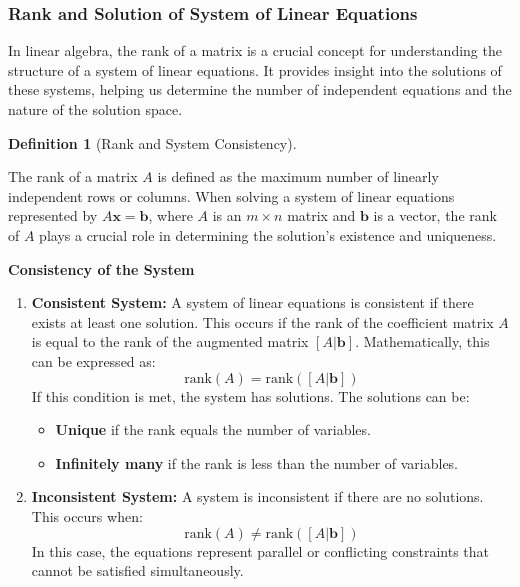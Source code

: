 \documentclass[
  letterpaper,
  DIV=11,
  numbers=noendperiod]{scrreprt}
\providecommand{\tightlist}{%
  \setlength{\itemsep}{0pt}\setlength{\parskip}{0pt}}\usepackage{longtable,booktabs,array}
\theoremstyle{plain}
\theoremstyle{definition}
\newtheorem{definition}{Definition}[chapter]
\theoremstyle{remark}
\begin{document}
\subsubsection*{Rank and Solution of System of Linear
Equations}\label{rank-and-solution-of-system-of-linear-equations}

In linear algebra, the rank of a matrix is a crucial concept for
understanding the structure of a system of linear equations. It provides
insight into the solutions of these systems, helping us determine the
number of independent equations and the nature of the solution space.

\begin{definition}[Rank and System
Consistency]\protect\hypertarget{def-soln}{}\label{def-soln}

The rank of a matrix \(A\) is defined as the maximum number of linearly
independent rows or columns. When solving a system of linear equations
represented by \(A\mathbf{x} = \mathbf{b}\), where \(A\) is an
\(m \times n\) matrix and \(\mathbf{b}\) is a vector, the rank of \(A\)
plays a crucial role in determining the solution's existence and
uniqueness.

\textbf{Consistency of the System}

\begin{enumerate}
\def\labelenumi{\arabic{enumi}.}
\tightlist
\item
  \textbf{Consistent System:} A system of linear equations is consistent
  if there exists at least one solution. This occurs if the rank of the
  coefficient matrix \(A\) is equal to the rank of the augmented matrix
  \([A|\mathbf{b}]\). Mathematically, this can be expressed as:
  \[\text{rank}(A) = \text{rank}([A|\mathbf{b}])\] If this condition is
  met, the system has solutions. The solutions can be:

  \begin{itemize}
  \tightlist
  \item
    \textbf{Unique} if the rank equals the number of variables.
  \item
    \textbf{Infinitely many} if the rank is less than the number of
    variables.
  \end{itemize}
\item
  \textbf{Inconsistent System:} A system is inconsistent if there are no
  solutions. This occurs when:
  \[\text{rank}(A) \ne \text{rank}([A|\mathbf{b}])\] In this case, the
  equations represent parallel or conflicting constraints that cannot be
  satisfied simultaneously.
\end{enumerate}

\end{definition}
\end{document}
